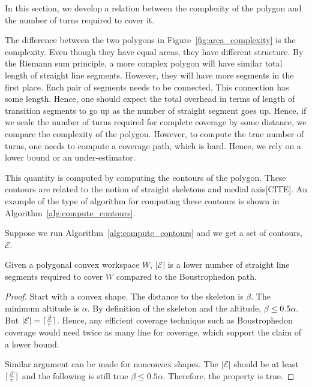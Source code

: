 \documentclass[../main.tex]{subfiles}
\begin{document}
In this section, we develop a relation between the complexity of the polygon and the number of turns required to cover it.

The difference between the two polygons in Figure~\ref{fig:area_complexity} is the complexity. Even though they have equal areas, they have different structure. By the Riemann sum principle, a more complex polygon will have similar total length of straight line segments. However, they will have more segments in the first place. Each pair of segments needs to be connected. This connection has some length. Hence, one should expect the total overhead in terms of length of transition segments to go up as the number of straight segment goes up. Hence, if we scale the number of turns required for complete coverage by some distance, we compare the complexity of the polygon. However, to compute the true number of turns, one needs to compute a coverage path, which is hard. Hence, we rely on a lower bound or an under-estimator.

This quantity is computed by computing the contours of the polygon. These contours are related to the notion of straight skeletons and medial axis[CITE]. An example of the type of algorithm for computing these contours is shown in Algorithm~\ref{alg:compute_contours}.

Suppose we run Algorithm~\ref{alg:compute_contours} and we get a set of contours, $\mathcal{E}$.

\begin{proposition}
	Given a polygonal convex workspace $W$, $|\mathcal{E}|$ is a lower number of straight line segments required to cover $W$ compared to the Boustrophedon path.
\end{proposition}
\begin{proof}

Start with a convex shape. The distance to the skeleton is $\beta$. The minimum altitude is $\alpha$. By definition of the skeleton and the altitude, $\beta\leq 0.5\alpha$. But $|\mathcal{E}|=\lceil\frac{\beta}{r}\rceil$. Hence, any efficient coverage technique such as Boustrophedon coverage would need twice as many line for coverage, which support the claim of a lower bound.

Similar argument can be made for nonconvex shapes. The $|\mathcal{E}|$ should be at least $\lceil\frac{\beta}{r}\rceil$ and the following is still true $\beta\leq 0.5\alpha$. Therefore, the property is true.
\end{proof}
\end{document}
